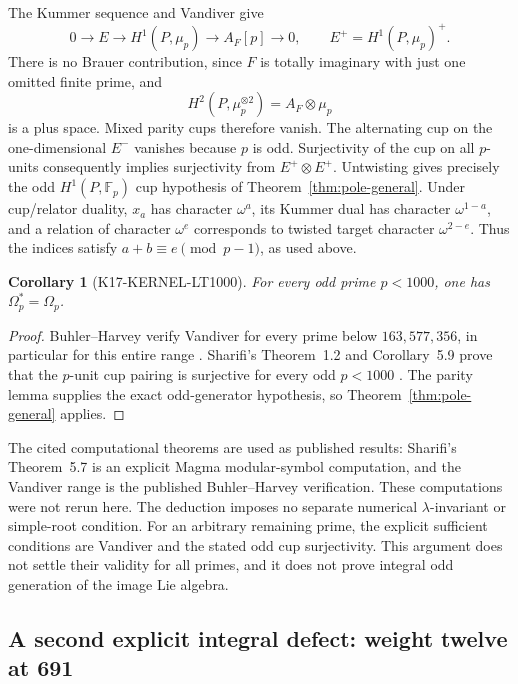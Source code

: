 \documentclass[11pt,a4paper]{article}
\newtheorem{corollary}[theorem]{Corollary}
\theoremstyle{definition}
\begin{document}
The Kummer sequence and Vandiver give
\[
 0\longrightarrow E\longrightarrow H^1(P,\mu_p)
  \longrightarrow A_F[p]\longrightarrow0,
 \qquad E^+=H^1(P,\mu_p)^+.
\]
There is no Brauer contribution, since $F$ is totally imaginary with just one omitted finite prime, and
\[
 H^2(P,\mu_p^{\otimes2})=A_F\otimes\mu_p
\]
is a plus space. Mixed parity cups therefore vanish. The alternating cup on the one-dimensional $E^-$ vanishes because $p$ is odd. Surjectivity of the cup on all $p$-units consequently implies surjectivity from $E^+\otimes E^+$. Untwisting gives precisely the odd $H^1(P,\mathbb F_p)$ cup hypothesis of Theorem~\ref{thm:pole-general}. Under cup/relator duality, $x_a$ has character $\omega^a$, its Kummer dual has character $\omega^{1-a}$, and a relation of character $\omega^e$ corresponds to twisted target character $\omega^{2-e}$. Thus the indices satisfy $a+b\equiv e\pmod{p-1}$, as used above.

\begin{corollary}[K17-KERNEL-LT1000]\label{cor:kernel-lt1000}
For every odd prime $p<1000$, one has $\Omega_p^*=\Omega_p$.
\end{corollary}
\begin{proof}
Buhler--Harvey verify Vandiver for every prime below $163{,}577{,}356$, in particular for this entire range \cite[abstract and \S1, p.~1]{BuhlerHarvey2011}. Sharifi's Theorem~1.2 and Corollary~5.9 prove that the $p$-unit cup pairing is surjective for every odd $p<1000$ \cite[pp.~2 and~27]{Sharifi2007}. The parity lemma supplies the exact odd-generator hypothesis, so Theorem~\ref{thm:pole-general} applies.
\end{proof}

The cited computational theorems are used as published results: Sharifi's Theorem~5.7 is an explicit Magma modular-symbol computation, and the Vandiver range is the published Buhler--Harvey verification. These computations were not rerun here. The deduction imposes no separate numerical $\lambda$-invariant or simple-root condition. For an arbitrary remaining prime, the explicit sufficient conditions are Vandiver and the stated odd cup surjectivity. This argument does not settle their validity for all primes, and it does not prove integral odd generation of the image Lie algebra.

\subsection{A second explicit integral defect: weight twelve at 691}
\end{document}
